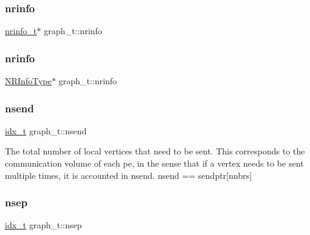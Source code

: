 \subsubsection{\texorpdfstring{nrinfo}{nrinfo}\hspace{0.1cm}{\footnotesize\ttfamily [1/2]}}
{\footnotesize\ttfamily \hyperlink{a00730}{nrinfo\+\_\+t}$\ast$ graph\+\_\+t\+::nrinfo}

\mbox{\label{a00734_a2ee093704fdbad45e3108505bbd29594}} 
\subsubsection{\texorpdfstring{nrinfo}{nrinfo}\hspace{0.1cm}{\footnotesize\ttfamily [2/2]}}
{\footnotesize\ttfamily \hyperlink{a00978_a6393d515f02fcdaf17a06297a8db5bbb}{N\+R\+Info\+Type}$\ast$ graph\+\_\+t\+::nrinfo}

\mbox{\label{a00734_ad172a266308975947ef623856df72c87}} 
\subsubsection{\texorpdfstring{nsend}{nsend}}
{\footnotesize\ttfamily \hyperlink{a00876_aaa5262be3e700770163401acb0150f52}{idx\+\_\+t} graph\+\_\+t\+::nsend}

The total number of local vertices that need to be sent. This corresponds to the communication volume of each pe, in the sense that if a vertex needs to be sent multiple times, it is accounted in nsend. nsend == sendptr\mbox{[}nnbrs\mbox{]} \mbox{\label{a00734_a723e8c2de97704284f492b53c21e9fad}} 
\subsubsection{\texorpdfstring{nsep}{nsep}}
{\footnotesize\ttfamily \hyperlink{a00876_aaa5262be3e700770163401acb0150f52}{idx\+\_\+t} graph\+\_\+t\+::nsep}

\mbox{\label{a00734_a7e70f7ea557eaa17352b8068c8cb5f03}} 

